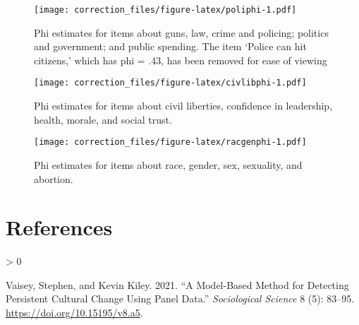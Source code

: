 \documentclass[
]{article}
\newlength{\cslhangindent}
\newenvironment{CSLReferences}[2] %
 {%
  \setlength{\parindent}{0pt}
  \ifodd #1 \everypar{\setlength{\hangindent}{\cslhangindent}}\ignorespaces\fi
  \ifnum #2 > 0
  \setlength{\parskip}{#2\baselineskip}
  \fi
 }%
 {}
\begin{document}
\begin{figure}
\centering
\texttt{[image: correction\_files/figure-latex/poliphi-1.pdf]}
\caption{Phi estimates for items about guns, law, crime and policing;
politics and government; and public spending. The item `Police can hit
citizens,' which has phi = .43, has been removed for ease of viewing}
\end{figure}

\begin{figure}
\centering
\texttt{[image: correction\_files/figure-latex/civlibphi-1.pdf]}
\caption{Phi estimates for items about civil liberties, confidence in
leadership, health, morale, and social trust.}
\end{figure}

\begin{figure}
\centering
\texttt{[image: correction\_files/figure-latex/racgenphi-1.pdf]}
\caption{Phi estimates for items about race, gender, sex, sexuality, and
abortion.}
\end{figure}

\hypertarget{references}{%
\section*{References}\label{references}}

\hypertarget{refs}{}
\begin{CSLReferences}{1}{0}
\leavevmode\hypertarget{ref-vaisey2021}{}%
Vaisey, Stephen, and Kevin Kiley. 2021. {``A Model-Based Method for
Detecting Persistent Cultural Change Using Panel Data.''}
\emph{Sociological Science} 8 (5): 83--95.
\url{https://doi.org/10.15195/v8.a5}.

\end{CSLReferences}
\end{document}
